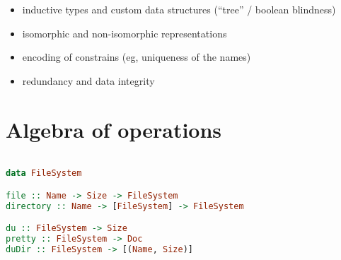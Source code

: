 \documentclass[10pt]{beamer}
\begin{document}
\begin{frame}[fragile]
  \begin{itemize} 
    \item inductive types and custom data structures (``tree'' / boolean blindness)
    \item isomorphic and non-isomorphic representations 
    \item encoding of constrains (eg, uniqueness of the names)
    \item redundancy and data integrity 
  \end{itemize}
\end{frame}


\section{Algebra of operations}


\begin{frame}[fragile]
\begin{lstlisting}[language=haskell]

data FileSystem

file :: Name -> Size -> FileSystem
directory :: Name -> [FileSystem] -> FileSystem 

du :: FileSystem -> Size 
pretty :: FileSystem -> Doc 
duDir :: FileSystem -> [(Name, Size)]
\end{lstlisting}
\end{frame}


\begin{frame}[fragile]
  \begin{lstlisting}[language=haskell]
  \end{lstlisting}
\end{frame}

\begin{frame}[fragile]
  \begin{lstlisting}[language=haskell]
  \end{lstlisting}
\end{frame}
\begin{frame}[fragile]
  \begin{lstlisting}[language=haskell]
  \end{lstlisting}
\end{frame}
\begin{frame}[fragile]
  \begin{lstlisting}[language=haskell]
  \end{lstlisting}
\end{frame}

% 
% 
\end{document}
